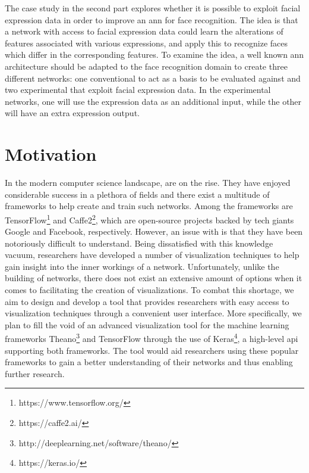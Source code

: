 \noindent The case study in the second part explores whether it is possible to exploit facial expression data in order to improve an \acrshort{ann} for face recognition. The idea is that a network with access to facial expression data could learn the alterations of features associated with various expressions, and apply this to recognize faces which differ in the corresponding features. To examine the idea, a well known \acrshort{ann} architecture should be adapted to the face recognition domain to create three different networks: one conventional to act as a basis to be evaluated against and two experimental that exploit facial expression data. In the experimental networks, one will use the expression data as an additional input, while the other will have an extra expression output. \\

\section{Motivation}

\noindent In the modern computer science landscape,  are on the rise. They have enjoyed considerable success in a plethora of fields and there exist a multitude of frameworks to help create and train such networks. Among the frameworks are TensorFlow\footnote{https://www.tensorflow.org/} and Caffe2\footnote{https://caffe2.ai/}, which are open-source projects backed by tech giants Google and Facebook, respectively. However, an issue with  is that they have been notoriously difficult to understand. Being dissatisfied with this knowledge vacuum, researchers have developed a number of visualization techniques to help gain insight into the inner workings of a network. Unfortunately, unlike the building of networks, there does not exist an extensive amount of options when it comes to facilitating the creation of visualizations. To combat this shortage, we aim to design and develop a tool that provides researchers with easy access to visualization techniques through a convenient user interface. More specifically, we plan to fill the void of an advanced visualization tool for the machine learning frameworks Theano\footnote{http://deeplearning.net/software/theano/} and TensorFlow through the use of Keras\footnote{https://keras.io/}, a high-level \acrfull{api} supporting both frameworks. The tool would aid researchers using these popular frameworks to gain a better understanding of their networks and thus enabling further research. \\

